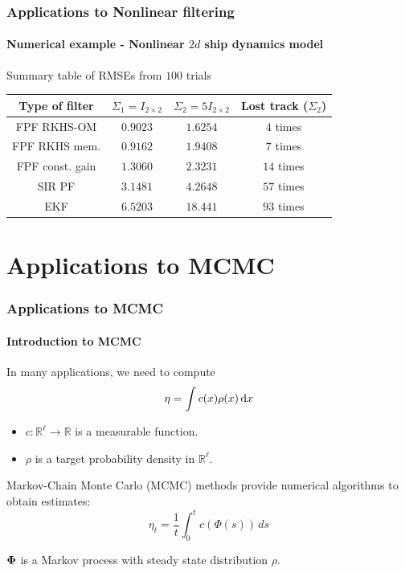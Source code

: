 \documentclass[xcolor=dvipsnames, subsection=false]{beamer}
\def\bfmath#1{{\mathchoice{\mbox{\boldmath$#1$}}%
{\mbox{\boldmath$#1$}}%
{\mbox{\boldmath$\scriptstyle#1$}}%
{\mbox{\boldmath$\scriptscriptstyle#1$}}}}
\def\bfPhi{\bfmath{\Phi}}
\newcommand{\field}[1]{\mathbb{#1}}
\def\Re{\field{R}}
\def\rmd{\,\textmd{d}}
\def\markovstate{\Phi}
\newcommand{\pr}{\rho}
\begin{document}
\begin{frame}
\begin{minipage}[t][6.5cm][t]{\textwidth}
\end{minipage}
\end{frame}

\begin{frame}
\frametitle{Applications to Nonlinear filtering}
\framesubtitle{Numerical example - Nonlinear $2d$ ship dynamics model}
\begin{center}
	\centering Summary table of RMSEs from $100$ trials	\begin{tabular}{ |c|c|c|c| }
		\hline
		Type of filter & $\Sigma_1 = I_{2 \times 2}$ & $\Sigma_2 = 5I_{2 \times 2}$ & Lost track ($\Sigma_2$) \\
		\hline
		FPF RKHS-OM & $0.9023$  &  $1.6254$ & $4$ times\\
		FPF RKHS mem. &$0.9162$ &  $ 1.9408$ & $ 7 $ times\\
		FPF const. gain & $1.3060$ & $2.3231$ & $14$ times \\
		SIR PF & $3.1481$  &  $4.2648$ &  $57$ times \\
		EKF &  $6.5203$ & $18.441$ & $93$ times \\ 		
		\hline
	\end{tabular}
\end{center}
\end{frame}

\section{Applications to MCMC}
\begin{frame}
\frametitle{Applications to MCMC}
\framesubtitle{Introduction to MCMC}
In many applications, we need to compute
\begin{equation*}
\eta = \int c(x)\pr(x) \rmd x
\label{e:eta}
\end{equation*}
\begin{itemize}
	\item $c\colon\Re^\ell\to\Re$ is a measurable function.
	\item $\pr$ is a target probability density in $\Re^\ell$.
\end{itemize}
 Markov-Chain Monte Carlo (MCMC) methods provide numerical algorithms to obtain estimates:
	\[
	\eta_t =\frac{1}{t}\int_0^t c(\markovstate(s)) \, ds
	\label{e:sample_mean}
	\]
\begin{center}
	$\bfPhi$ is a Markov process with steady state distribution $\pr$.
\end{center}
\end{frame}
\end{document}
